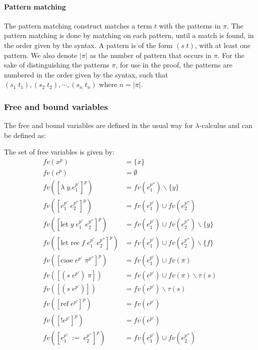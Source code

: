 \documentclass[../../master.tex]{subfiles}
\begin{document}
\paragraph{Pattern matching}
The pattern matching construct matches a term $t$ with the patterns in $\pi$.
The pattern matching is done by matching on each pattern, until a match is found, in the order given by the syntax.
A pattern is of the form $(s\;t)$, with at least one pattern.
We also denote $|\pi|$ as the number of pattern that occurs in $\pi$.
For the sake of distinguishing the patterns $\pi$, for use in the proof, the patterns are numbered in the order given by the syntax, such that $(s_1\;t_1),(s_2\;t_2),\cdots,(s_n\;t_n)$ where $n=|\pi|$.

\subsubsection{Free and bound variables}
The free and bound variables are defined in the usual way for $\lambda$-calculus and can be defined as:
\begin{definition}\label{def:fv}
	The set of free variables is given by:
	\begin{align*}
		fv(x^p)&=\{x\}\\
		fv(c^p)&=\emptyset\\
		fv([\lambda\;y.e_1^{p'}]^p)&=fv(e_1^{p''})\backslash\{y\}\\
		fv([e_1^{p'}\;e_2^{p''}]^p)&=fv(e_1^{p'})\cup fv(e_2^{p''})\\
		fv([\mbox{let}\;y\;e_1^{p'}\;e_2^{p''}]^p)&=fv(e_1^{p'})\cup fv(e_2^{p''})\backslash\{y\}\\
		fv([\mbox{let rec}\;f\;e_1^{p'}\;e_2^{p''}]^p)&=fv(e_1^{p'})\cup fv(e_2^{p''})\backslash\{f\}\\
		fv([\mbox{case}\;e^{p'}\;\pi^{p''}]^p)&=fv(e_1^{p'})\cup fv(\pi)\\
		fv([(s\;e^{p'})\;\pi])&=fv(e^{p'})\cup fv(\pi)\backslash\tau(s)\\
		fv([(s\;e^{p'})])&=fv(e^{p'})\backslash\tau(s)\\
		fv([\mbox{ref}\;e^{p'}]^p)&=fv(e^{p'})\\
		fv([!e^{p'}]^p)&=fv(e^{p'})\\
		fv([e_1^{p'}\;:=\;e_2^{p''}]^p)&=fv(e_1^{p'})\cup fv(e_2^{p''})\\
	\end{align*}
\end{definition}
\end{document}
